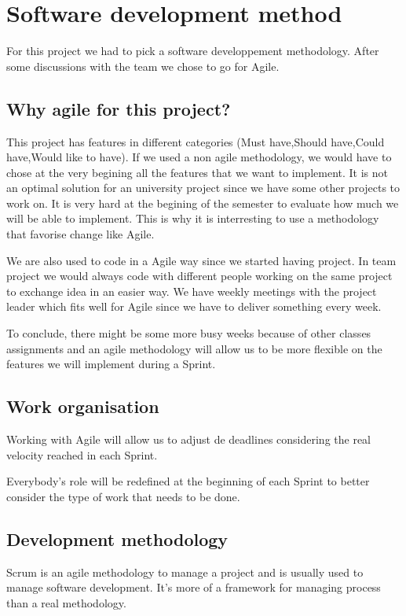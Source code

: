 \section{Software development method}

For this project we had to pick a software developpement methodology. After some discussions with the team we chose to go for Agile.

\subsection{Why agile for this project?}

This project has features in different categories (Must have,Should have,Could have,Would like to have). If we used a non agile methodology, we would have to chose at the very begining all the features that we want to implement.
It is not an optimal solution for an university project since we have some other projects to work on. It is very hard at the begining of the semester to evaluate how much we will be able to implement. This is why it is interresting to use a methodology that favorise change like Agile.\newline

We are also used to code in a Agile way since we started having project. In team project we would always code with different people working on the same project to exchange idea in an easier way.
We have weekly meetings with the project leader which fits well for Agile since we have to deliver something every week.\newline

To conclude, there might be some more busy weeks because of other classes assignments and an agile methodology will allow us to be more flexible on the features we will implement during a Sprint.

\subsection{Work organisation}
Working with Agile will allow us to adjust de deadlines considering the real velocity reached in each Sprint.\newline

Everybody's role will be redefined at the beginning of each Sprint to better consider the type of work that needs to be done.


\subsection{Development methodology}
Scrum is an agile methodology to manage a project and is usually used to manage software development. It's more of a framework for managing process than a real methodology.\newline


